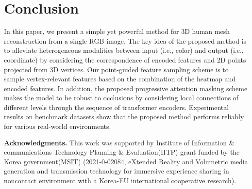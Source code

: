 \documentclass[10pt,twocolumn,letterpaper]{article}
\begin{document}
\section{Conclusion}
In this paper, we present a simple yet powerful method for 3D human mesh reconstruction from a single RGB image. The key idea of the proposed method is to alleviate heterogeneous modalities between input (i.e., color) and output (i.e., coordinate) by considering the correspondence of encoded features and 2D points projected from 3D vertices. Our point-guided feature sampling scheme is to sample vertex-relevant features based on the combination of the heatmap and encoded features. In addition, the proposed progressive attention masking scheme makes the model to be robust to occlusions by considering local connections of different levels through the sequence of transformer encoders. Experimental results on benchmark datasets show that the proposed method performs reliably for various real-world environments. 

\noindent\textbf{Acknowledgments.} This work was supported by Institute of Information \& communications Technology Planning \& Evaluation(IITP) grant funded by the Korea government(MSIT) (2021-0-02084, eXtended Reality and Volumetric media generation and transmission technology for immersive experience sharing in noncontact environment with a Korea-EU international cooperative research).

{\small


}
\end{document}
